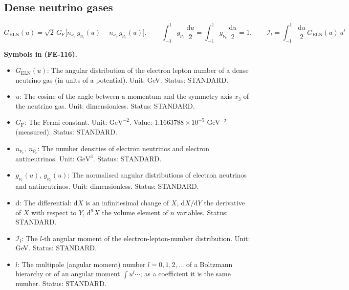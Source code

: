 \documentclass[
  10pt,
]{article}
\providecommand{\tightlist}{%
  \setlength{\itemsep}{0pt}\setlength{\parskip}{0pt}}
\begin{document}
\hypertarget{dense-neutrino-gases}{%
\subsection{Dense neutrino gases}\label{dense-neutrino-gases}}

\[
G_{\mathrm{ELN}}(u) = \sqrt2\,G_{\mathrm{F}}\big[n_{\nu_e}\,g_{\nu_e}(u) -
 n_{\bar\nu_e}\,g_{\bar\nu_e}(u)\big],\qquad
\int_{-1}^{1}g_{\nu_e}\,\frac{\mathrm{d}u}{2} = \int_{-1}^{1}g_{\bar\nu_e}\,\frac{\mathrm{d}u}{2} = 1,\qquad
\mathcal{I}_l = \int_{-1}^{1}\frac{\mathrm{d}u}{2}\,G_{\mathrm{ELN}}(u)\,u^l \tag{FE-116}
\]

\textbf{Symbols in (FE-116).}

\begin{itemize}
\tightlist
\item
  \(G_{\mathrm{ELN}}(u)\): The angular distribution of the electron
  lepton number of a dense neutrino gas (in units of a potential). Unit:
  GeV. Status: STANDARD.
\item
  \(u\): The cosine of the angle between a momentum and the symmetry
  axis \(x_3\) of the neutrino gas. Unit: dimensionless. Status:
  STANDARD.
\item
  \(G_{\mathrm{F}}\): The Fermi constant. Unit: \(\mathrm{GeV}^{-2}\).
  Value: \(1.1663788\times10^{-5}\) GeV\(^{-2}\) (measured). Status:
  STANDARD.
\item
  \(n_{\nu_e},\ n_{\bar\nu_e}\): The number densities of electron
  neutrinos and electron antineutrinos. Unit: \(\mathrm{GeV}^{3}\).
  Status: STANDARD.
\item
  \(g_{\nu_e}(u),\ g_{\bar\nu_e}(u)\): The normalised angular
  distributions of electron neutrinos and antineutrinos. Unit:
  dimensionless. Status: STANDARD.
\item
  \(\mathrm{d}\): The differential: \(\mathrm{d}X\) is an infinitesimal
  change of \(X\), \(\mathrm{d}X/\mathrm{d}Y\) the derivative of \(X\)
  with respect to \(Y\), \(\mathrm{d}^nX\) the volume element of \(n\)
  variables. Status: STANDARD.
\item
  \(\mathcal{I}_l\): The \(l\)-th angular moment of the
  electron-lepton-number distribution. Unit: GeV. Status: STANDARD.
\item
  \(l\): The multipole (angular moment) number \(l = 0, 1, 2, \dots\) of
  a Boltzmann hierarchy or of an angular moment \(\int u^l\cdots\); as a
  coefficient it is the same number. Status: STANDARD.
\end{itemize}
\end{document}

